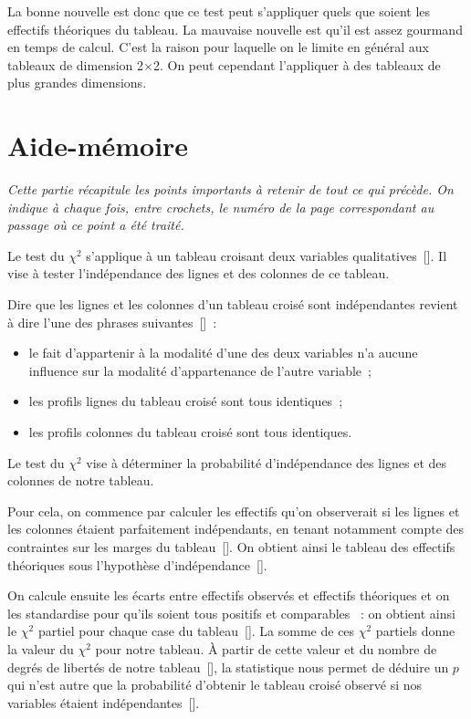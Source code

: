 \documentclass[a4paper,10pt,twoside,francais]{report}
\newcommand{\chid}{$\chi^2$\xspace}
\begin{document}
La bonne nouvelle est donc que ce test peut s'appliquer quels que
soient les effectifs théoriques du tableau. La mauvaise nouvelle est
qu'il est assez gourmand en temps de calcul. C'est la raison pour
laquelle on le limite en général aux tableaux de dimension 2$\times$2.
On peut cependant l'appliquer à des tableaux de plus grandes
dimensions.


\chapter{Aide-mémoire}
\label{sec-aidem}

\textit{Cette partie récapitule les points importants à retenir de
  tout ce qui précède. On indique à chaque fois, entre crochets, le
  numéro de la page correspondant au passage où ce point a été
  traité.}

Le test du \chid s'applique à un tableau croisant deux variables
qualitatives~[\pageref{ssec-tabcrois}]. Il vise à tester
l'indépendance des lignes et des colonnes de ce tableau.

Dire que les lignes et les colonnes d'un tableau croisé sont
indépendantes revient à dire l'une des phrases suivantes~[\pageref{ssec-hypindep}]~:
\begin{itemize}
\item le fait d'appartenir à la modalité d'une des deux variables n'a
  aucune influence sur la modalité d'appartenance de l'autre variable~;
\item les profils lignes du tableau croisé sont tous identiques~;
\item les profils colonnes du tableau croisé sont tous identiques.
\end{itemize}

Le test du \chid vise à déterminer la probabilité d'indépendance des
lignes et des colonnes de notre tableau.

Pour cela, on commence par calculer les effectifs qu'on observerait si
les lignes et les colonnes étaient parfaitement indépendants, en
tenant notamment compte des contraintes sur les marges du
tableau~[\pageref{ssec-contrmar}]. On obtient ainsi le tableau des
effectifs théoriques sous l'hypothèse
d'indépendance~[\pageref{ssec-calctheo}].

On calcule ensuite les écarts entre effectifs observés et effectifs
théoriques et on les \og standardise \fg{} pour qu'ils soient tous
positifs et \og comparables \fg{}~: on obtient ainsi le \chid partiel
pour chaque case du tableau~[\pageref{ssec-chidpartiels}]. La somme de
ces \chid partiels donne la valeur du \chid pour notre tableau. À
partir de cette valeur et du nombre de degrés de libertés de notre
tableau~[\pageref{ssec-ddl}], la statistique nous permet de déduire un $p$
qui n'est autre que la probabilité d'obtenir le tableau croisé observé
si nos variables étaient indépendantes~[\pageref{ssec-calcp}].
\end{document}
